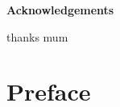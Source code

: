 \documentclass{book}
\newenvironment{acknowledgements}%
    {\cleardoublepage\thispagestyle{empty}\null\vfill\begin{center}%
    \bfseries Acknowledgements\end{center}}%
    {\vfill\null}
\begin{document}
\begin{acknowledgements}
thanks mum
\end{acknowledgements}

\chapter*{Preface}


\tableofcontents
\listoftables
\listoffigures
\listofalgorithms















\end{document}
